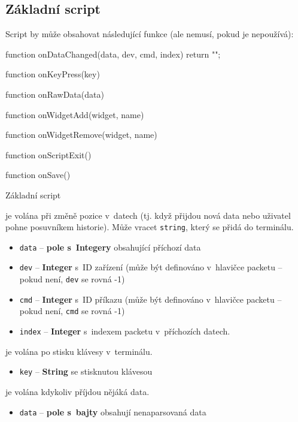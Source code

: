 \documentclass[12pt, a4paper, oneside]{article}
\begin{document}
\subsection*{Základní script}
Script by může obsahovat následující funkce (ale nemusí, pokud je nepoužívá):
\begin{listing}[H]
\begin{jscode}
function onDataChanged(data, dev, cmd, index) {
    return "";
}

function onKeyPress(key) {
}

function onRawData(data) {
}

function onWidgetAdd(widget, name) {
}

function onWidgetRemove(widget, name) {
}

function onScriptExit() {
}

function onSave() {
}
\end{jscode}
\caption{Základní script}
\label{input_script}
\end{listing}

 je volána při změně pozice v~datech (tj. když přijdou nová data nebo uživatel pohne posuvníkem historie). Může vracet \verb/string/, který se přidá do terminálu.

\begin{itemize}
    \item \verb/data/ -- {\bf pole s~Integery} obsahující příchozí data
    \item \verb/dev/ -- {\bf Integer} s~ID zařízení (může být definováno v~hlavičce packetu -- pokud není, \verb/dev/ se rovná -1)
    \item \verb/cmd/ -- {\bf Integer} s~ID příkazu (může být definováno v~hlavičce packetu -- pokud není, \verb/cmd/ se rovná -1)
    \item \verb/index/ -- {\bf Integer} s~indexem packetu v~příchozích datech.
\end{itemize}

 je volána po stisku klávesy v~terminálu.
\begin{itemize}
    \item \verb/key/ -- {\bf String} se stisknutou klávesou
\end{itemize}

 je volána kdykoliv příjdou nějáká data.
\begin{itemize}
    \item \verb/data/ -- {\bf pole s~bajty} obsahují nenaparsovaná data
\end{itemize}
\end{document}
